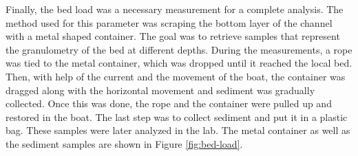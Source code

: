 
Finally, the bed load was a necessary measurement for a complete analysis. The method used for this parameter was scraping the bottom layer of the channel with a metal shaped container. The goal was to retrieve samples that represent the granulometry of the bed at different depths. 
During the measurements, a rope was tied to the metal container, which was dropped until it reached the local bed. Then, with help of the current and the movement of the boat, the container was dragged along with the horizontal movement and sediment was gradually collected. Once this was done, the rope and the container were pulled up and restored in the boat. The last step was to collect sediment and put it in a plastic bag. These samples were later analyzed in the lab. The metal container as well as the sediment samples are shown in Figure \ref{fig:bed-load}.

